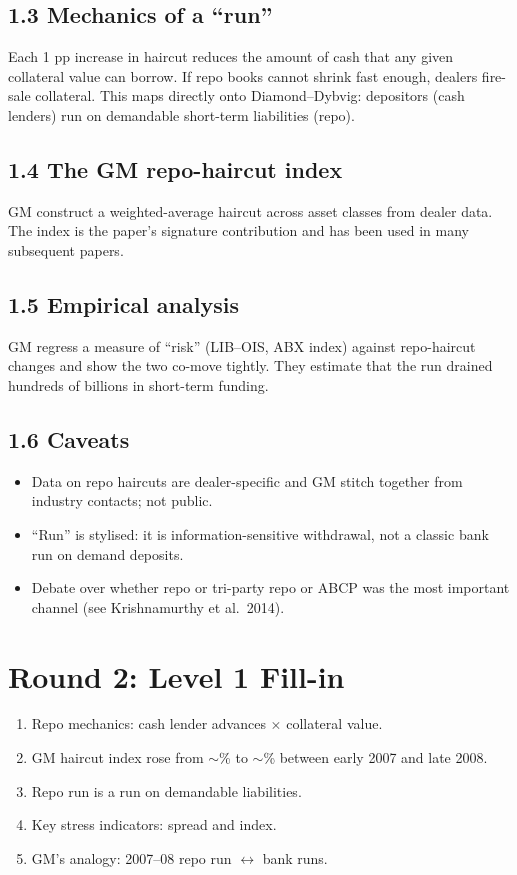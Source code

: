 \documentclass[11pt]{article}
\newcommand{\blank}[1]{\underline{\hspace{#1}}}
\begin{document}
\subsection*{1.3 Mechanics of a ``run''}
Each 1 pp increase in haircut reduces the amount of cash that any given collateral value can borrow. If repo books cannot shrink fast enough, dealers fire-sale collateral. This maps directly onto Diamond--Dybvig: depositors (cash lenders) run on demandable short-term liabilities (repo).

\subsection*{1.4 The GM repo-haircut index}
GM construct a weighted-average haircut across asset classes from dealer data. The index is the paper's signature contribution and has been used in many subsequent papers.

\subsection*{1.5 Empirical analysis}
GM regress a measure of ``risk'' (LIB--OIS, ABX index) against repo-haircut changes and show the two co-move tightly. They estimate that the run drained hundreds of billions in short-term funding.

\subsection*{1.6 Caveats}
\begin{alertbox}
\begin{itemize}
\item Data on repo haircuts are dealer-specific and GM stitch together from industry contacts; not public.
\item ``Run'' is stylised: it is information-sensitive withdrawal, not a classic bank run on demand deposits.
\item Debate over whether repo or tri-party repo or ABCP was the most important channel (see Krishnamurthy et al.~2014).
\end{itemize}
\end{alertbox}

\section*{Round 2: Level 1 Fill-in}
\begin{enumerate}
\item Repo mechanics: cash lender advances \blank{1cm} $\times$ collateral value.
\item GM haircut index rose from $\sim$\blank{1cm}\% to $\sim$\blank{1cm}\% between early 2007 and late 2008.
\item Repo run is a run on demandable \blank{2cm} liabilities.
\item Key stress indicators: \blank{2cm} spread and \blank{1cm} index.
\item GM's analogy: 2007--08 repo run $\leftrightarrow$ \blank{2cm} bank runs.
\end{enumerate}
\end{document}
